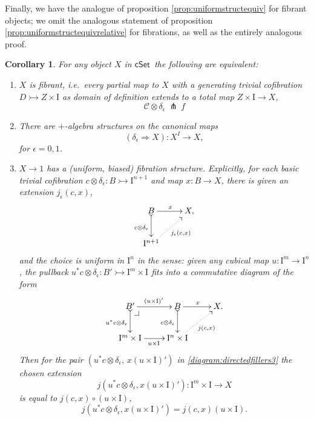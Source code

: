 \documentclass[11pt]{article}
\makeatletter
\newcommand{\cSet}{\ensuremath{\mathsf{cSet}}}
\newcommand{\pbcorner}[1][dr]{\save*!/#1-1.2pc/#1:(-1,1)@^{|-}\restore}
\newcommand{\mono}{\ensuremath{\rightarrowtail}}
\newcommand{\ra}{\ensuremath{\rightarrow}}
\newcommand{\I}{\ensuremath{\mathrm{I}}}
\newtheorem{corollary}[theorem]{Corollary}
\theoremstyle{remark}
\theoremstyle{definition}
\makeatother
\begin{document}
Finally, we have the analogue of proposition \ref{prop:uniformstructequiv} for fibrant objects; we omit the analogous statement of proposition \ref{prop:uniformstructequivrelative} for fibrations, as well as the entirely analogous proof.

\begin{corollary}\label{cor:uniformfibstructequiv}  For any object $X$ in \cSet\ the following are equivalent:
\begin{enumerate}
\item $X$ is \emph{fibrant}, i.e.\ every partial map to $X$ with a generating trivial cofibration $D \mono Z \times \I$ as domain of definition extends to a total map $Z \times \I \ra X$,
$$\mathcal{C}\otimes \delta_\epsilon\ \pitchfork\ f$$

\item There are $+$-algebra structures on the canonical maps $$(\delta_\epsilon\Rightarrow{X}) : X^I \to X,$$ for $\epsilon = 0,1$.

\item $X\ra 1$ has a \emph{(uniform, biased) fibration structure}.  Explicitly, for each basic trivial cofibration $c \otimes \delta_\epsilon : B \mono \I^{n+1}$ and map $x : B\ra X$, there is given an extension $j_\epsilon(c,x)$,
\begin{equation}\label{diagram:directedfillers}
\xymatrix{
B \ar@{>->}[d]_{c \otimes \delta_\epsilon} \ar[r]^{x} & X, \\
\I^{n+1}\ar@{.>}[ru]_{j_\epsilon(c,x)} &
}
\end{equation}
and the choice is \emph{uniform in $\I^n$} in the sense: given any cubical map $u : \I^m \ra \I^n$, the pullback  $u^*c \otimes \delta_\epsilon : B'\mono \I^{m}\times\I$ fits into a commutative diagram of the form
\begin{equation}\label{diagram:directedfillers3}
\xymatrix{
B' \ar@{>->}[d]_{u^*c \otimes \delta_\epsilon} \ar[r]^{(u\times\I)'} \pbcorner &  B \ar@{>->}[d]_{c \otimes \delta_\epsilon } \ar[r]^{x} & X. \\
\I^{m}\times\I \ar[r]_{u\times\I } & \I^{n}\times\I \ar@{.>}[ru]_{j(c,x)} &
}
\end{equation}
Then for the pair $(u^*c \otimes \delta_\epsilon,\, x(u\times\I)')$ in \eqref{diagram:directedfillers3} the chosen extension $$j(u^*c \otimes \delta_\epsilon,x(u\times\I)'): \I^m\times\I \to X$$ is equal to  $j(c,x)\circ (u\times\I)$,
\begin{equation}\label{eq:uniformfillers}
j(u^*c \otimes \delta_\epsilon,x(u\times\I)') = j(c,x) (u\times\I).
\end{equation}
\end{enumerate}
\end{corollary}
\end{document}
